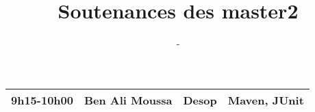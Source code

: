 \documentclass{article}
\title{\huge Soutenances des master2}
\author{\Huge \lemaster}
\date{\huge \ladate - \lasalle}
\begin{document}
\maketitle
\pagestyle{empty}
\Large

\hspace*{-3cm}\begin{tabular}[t]{|l|l|l|l|}\hline
9h15-10h00&Ben Ali Moussa&Desop&Maven, JUnit\\ \hline
\end{tabular}
\end{document}
